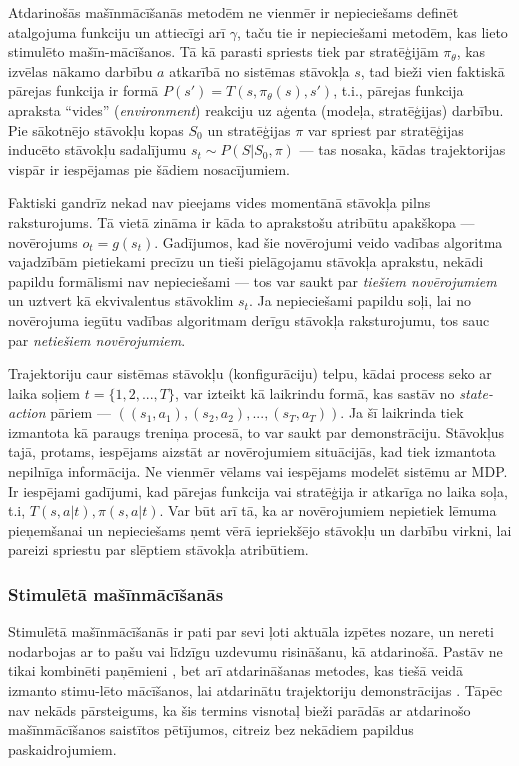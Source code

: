 \documentclass[12pt, a4paper]{article}
\numberwithin{equation}{section} %
\begin{document}
Atdarinošās mašīnmācīšanās metodēm ne vienmēr ir nepieciešams definēt atalgojuma funkciju un attiecīgi arī $\gamma$, taču tie ir nepieciešami metodēm, kas lieto stimulēto mašīn-mācīšanos. Tā kā parasti spriests tiek par stratēģijām $\pi_{\theta}$, kas izvēlas nākamo darbību $a$ atkarībā no sistēmas stāvokļa $s$, tad bieži vien faktiskā pārejas funkcija ir formā $P(s') = T(s, \pi_{\theta}(s), s')$, t.i., pārejas funkcija apraksta ``vides'' (\textit{environment}) reakciju uz aģenta (modeļa, stratēģijas) darbību. Pie sākotnējo stāvokļu kopas $S_0$ un stratēģijas $\pi$ var spriest par stratēģijas inducēto stāvokļu sadalījumu $s_t \sim P(S \vert S_0, \pi)$ --- tas nosaka, kādas trajektorijas vispār ir iespējamas pie šādiem nosacījumiem. 

Faktiski gandrīz nekad nav pieejams vides momentānā stāvokļa pilns raksturojums. Tā vietā zināma ir kāda to aprakstošu atribūtu apakškopa --- novērojums $o_t = g(s_t)$. Gadījumos, kad šie novērojumi veido vadības algoritma vajadzībām pietiekami precīzu un tieši pielāgojamu stāvokļa aprakstu, nekādi papildu formālismi nav nepieciešami --- tos var saukt par \textit{tiešiem novērojumiem} un uztvert kā ekvivalentus stāvoklim $s_t$. Ja nepieciešami papildu soļi, lai no novērojuma iegūtu vadības algoritmam derīgu stāvokļa raksturojumu, tos sauc par \textit{netiešiem novērojumiem}.

Trajektoriju caur sistēmas stāvokļu (konfigurāciju) telpu, kādai process seko ar laika soļiem $t = \lbrace 1, 2, ..., T \rbrace$, var izteikt kā laikrindu formā, kas sastāv no \textit{state-action} pāriem --- $((s_1, a_1), (s_2, a_2), ..., (s_T, a_T))$. Ja šī laikrinda tiek izmantota kā paraugs treniņa procesā, to var saukt par demonstrāciju. Stāvokļus tajā, protams, iespējams aizstāt ar novērojumiem situācijās, kad tiek izmantota nepilnīga informācija. Ne vienmēr vēlams vai iespējams modelēt sistēmu ar MDP. Ir iespējami gadījumi, kad pārejas funkcija vai stratēģija ir atkarīga no laika soļa, t.i, $T(s,a \vert t), \pi(s,a \vert t)$. Var būt arī tā, ka ar novērojumiem nepietiek lēmuma pieņemšanai un nepieciešams ņemt vērā iepriekšējo stāvokļu un darbību virkni, lai pareizi spriestu par slēptiem stāvokļa atribūtiem. 

\subsubsection{Stimulētā mašīnmācīšanās}

Stimulētā mašīnmācīšanās ir pati par sevi ļoti aktuāla izpētes nozare, un nereti nodarbojas ar to pašu vai līdzīgu uzdevumu risināšanu, kā atdarinošā. Pastāv ne tikai kombinēti paņēmieni \cite{gupta2019relay, brown2019extrapolating}, bet arī atdarināšanas metodes, kas tiešā veidā izmanto stimu-lēto mācīšanos, lai atdarinātu trajektoriju demonstrācijas \cite{englert2018learning}. Tāpēc nav nekāds pārsteigums, ka šis termins visnotaļ bieži parādās ar atdarinošo mašīnmācīšanos saistītos pētījumos, citreiz bez nekādiem papildus paskaidrojumiem.
\end{document}
